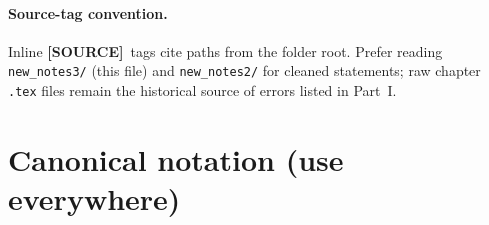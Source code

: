 \documentclass[11pt,a4paper]{article}
\theoremstyle{plain}
\theoremstyle{definition}
\theoremstyle{remark}
\newcommand{\SOURCE}{\textcolor{gray!50!black}{\textbf{[SOURCE]}}}
\begin{document}
\paragraph{Source-tag convention.}
Inline \SOURCE\ tags cite paths from the folder root. Prefer reading
\texttt{new\_notes3/} (this file) and \texttt{new\_notes2/} for cleaned
statements; raw chapter \texttt{.tex} files remain the historical source of
errors listed in Part~I.

\section{Canonical notation (use everywhere)}
\label{sec:notation}
\end{document}
